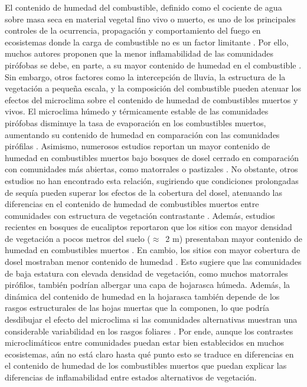 El contenido de humedad del combustible, definido como el cociente de agua sobre masa seca en material vegetal fino vivo o muerto, es uno de los principales controles de la ocurrencia, propagación y comportamiento del fuego en ecosistemas donde la carga de combustible no es un factor limitante \citep{burgan_estimating_1979, rothermel_how_1983, matthews_dead_2013, nolan_large-scale_2016, pimont_why_2019, cawson_exploring_2020}. Por ello, muchos autores proponen que la menor inflamabilidad de las comunidades pirófobas se debe, en parte, a su mayor contenido de humedad en el combustible \citep{wood_alternative_2012, kitzberger_firevegetation_2016, tepley_influences_2018, burton_shifting_2019, furlaud_fire_2021}. Sin embargo, otros factores como la intercepción de lluvia, la estructura de la vegetación a pequeña escala, y la composición del combustible pueden atenuar los efectos del microclima sobre el contenido de humedad de combustibles muertos y vivos.
El microclima húmedo y térmicamente estable de las comunidades pirófobas disminuye la tasa de evaporación en los combustibles muertos, aumentando su contenido de humedad en comparación con las comunidades pirófilas \citep{burgan_estimating_1979, rothermel_how_1983, matthews_dead_2013}. Asimismo, numerosos estudios reportan un mayor contenido de humedad en combustibles muertos bajo bosques de dosel cerrado en comparación con comunidades más abiertas, como matorrales o pastizales \citep{uhl_fire_1988, ray_micrometeorological_2005, hoffmann_fuels_2012, balch_susceptibility_2015, cawson_fuel_2017}. No obstante, otros estudios no han encontrado esta relación, sugiriendo que condiciones prolongadas de sequía pueden superar los efectos de la cobertura del dosel, atenuando las diferencias en el contenido de humedad de combustibles muertos entre comunidades con estructura de vegetación contrastante \citep{faiella_fluctuations_2007, estes_seasonal_2012}. Además, estudios recientes en bosques de eucaliptos reportaron que los sitios con mayor densidad de vegetación a pocos metros del suelo ($\approx$~2 m) presentaban mayor contenido de humedad en combustibles muertos \citep{brown_forest_2021, pickering_darker_2021}. En cambio, los sitios con mayor cobertura de dosel mostraban menor contenido de humedad \citep{brown_forest_2021}. Esto sugiere que las comunidades de baja estatura con elevada densidad de vegetación, como muchos matorrales pirófilos, también podrían albergar una capa de hojarasca húmeda. Además, la dinámica del contenido de humedad en la  hojarasca también depende de los rasgos estructurales de las hojas muertas que la componen, lo que podría desdibujar el efecto del microclima si las comunidades alternativas muestran una considerable variabilidad en los rasgos foliares \citep{wotton_stand-specific_2007, nelson_influence_2008,de_magalhaes_moisture_2021}. Por ende, aunque los contrastes microclimáticos entre comunidades puedan estar bien establecidos en muchos ecosistemas, aún no está claro hasta qué punto esto se traduce en diferencias en el contenido de humedad de los combustibles muertos que puedan explicar las diferencias de inflamabilidad entre estados alternativos de vegetación.

